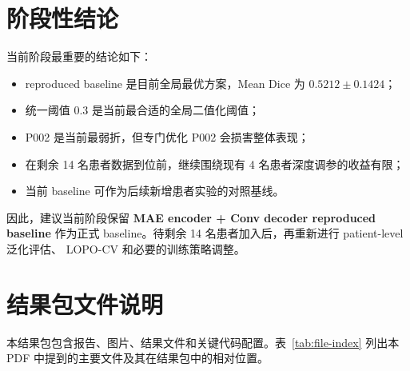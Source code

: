 \documentclass[UTF8,11pt]{ctexart}
\begin{document}
\section{阶段性结论}

当前阶段最重要的结论如下：

\begin{itemize}
  \item reproduced baseline 是目前全局最优方案，Mean Dice 为 $0.5212 \pm 0.1424$；
  \item 统一阈值 0.3 是当前最合适的全局二值化阈值；
  \item P002 是当前最弱折，但专门优化 P002 会损害整体表现；
  \item 在剩余 14 名患者数据到位前，继续围绕现有 4 名患者深度调参的收益有限；
  \item 当前 baseline 可作为后续新增患者实验的对照基线。
\end{itemize}

因此，建议当前阶段保留 \textbf{MAE encoder + Conv decoder reproduced baseline}
作为正式 baseline。待剩余 14 名患者加入后，再重新进行 patient-level 泛化评估、
LOPO-CV 和必要的训练策略调整。

\section{结果包文件说明}

本结果包包含报告、图片、结果文件和关键代码配置。表~\ref{tab:file-index}
列出本 PDF 中提到的主要文件及其在结果包中的相对位置。
\end{document}
